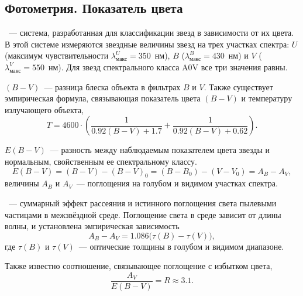 \subsection{Фотометрия. Показатель цвета}
~--- система, разработанная для классификации звезд в зависимости от их цвета. В этой системе измеряются звездные величины звезд на трех участках спектра: $U$ (максимум чувствительности $\lambda_\text{макс}^U = 350$~нм), $B$ ($\lambda_\text{макс}^B = 430$~нм) и $V$ ($\lambda_\text{макс}^V = 550$~нм). Для звезд спектрального класса A0V все три значения равны.

 $(B-V)$~--- разница блеска объекта в фильтрах $B$ и $V$. Также существует эмпирическая формула, связывающая показатель цвета $(B-V)$ и температуру излучающего объекта,
\begin{equation}
T = 4600 \cdot\left(\frac{1}{0.92\left(B-V\right) + 1.7} + \frac{1}{0.92\left(B-V\right) + 0.62}\right).
\end{equation}

 $E\left(B - V\right)$~--- разность между наблюдаемым показателем цвета звезды и нормальным, свойственным ее спектральному классу.
\begin{equation}
E\left(B - V\right) = \left(B - V\right) - \left(B - V\right)_0 = \left(B - B_0\right) - \left(V - V_0\right) = A_B - A_V,
\end{equation}
величины $A_B$ и $A_V$~--- поглощения на голубом и видимом участках спектра.

~--- суммарный эффект рассеяния и истинного поглощения света пылевыми частицами в межзвёздной среде. Поглощение света в среде зависит от длины волны, и установлена эмпирическая зависимость
\begin{equation}
A_B - A_V = 1.086 \bigl(\tau\left(B\right) - \tau\left(V\right)\bigr),
\end{equation}
где $\tau\left(B\right)$ и $\tau\left(V\right)$~---  оптические толщины в голубом и видимом диапазоне.

Также известно соотношение, связывающее поглощение с избытком цвета,
\begin{equation}
\frac{A_V}{E\left(B - V\right)} = R \approx 3.1.
\end{equation}